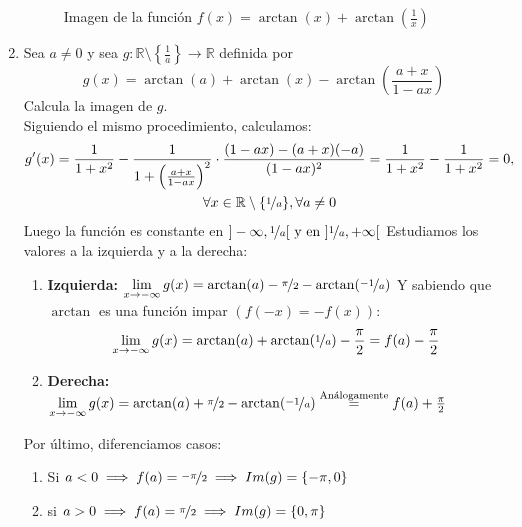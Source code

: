 \documentclass[12pt]{article}
\begin{document}
\begin{ejercicio}
\begin{enumerate}[label=\alph*)]
\begin{figure}
        \caption{Imagen de la función $f(x) = \arctan(x) + \arctan\left(\frac{1}{x}\right)$}
        \label{fig:imagen-f}
    \end{figure}
    
     \item Sea $a\neq 0$ y sea $g:\mathbb{R}\setminus \left\{\frac{1}{a}\right\}\longrightarrow \mathbb{R}$ definida por
                \begin{equation*}
                    g(x) = \arctan(a) + \arctan(x) - \arctan\left(\dfrac{a+x}{1-ax}\right)
                \end{equation*}
                Calcula la imagen de $g$.\\

    Siguiendo el mismo procedimiento, calculamos:
    \begin{multline*}
        g'(x) = \frac1{1+x^2}-\frac{1}{1 + \left( \frac{a + x}{1 - ax} \right)^2} \cdot
        \frac{(1 - ax) - (a + x)(-a)}{(1 - ax)^2} = \frac1{1+x^2}-\frac1{1+x^2} = 0,
        \\\forall x \in \mathbb{R}\setminus\{\nicefrac{1}{a}\}, \forall a \neq0
    \end{multline*}
Luego la función es constante en $]-\infty,\nicefrac{1}{a}[ \text{ y en } ]\nicefrac{1}{a}, +\infty[$
\newline
Estudiamos los valores a la izquierda y a la derecha:
\begin{enumerate}
    \item \textbf{Izquierda: } $\lim\limits_{x\to -\infty}{g(x)}=\arctan(a)  - \nicefrac{\pi}{2} - \arctan(\nicefrac{-1}{a})$ \newline Y sabiendo que $\arctan$ es una función impar $(f(-x) = -f(x))$: $$\lim\limits_{x\to -\infty}{g(x)}=\arctan(a)+\arctan(\nicefrac{1}{a}) - \frac \pi2 = f(a) - \frac \pi2$$
    \item \textbf{Derecha: } $\lim\limits_{x\to -\infty}{g(x)}=\arctan(a) + \nicefrac{\pi}{2} - \arctan(\nicefrac{-1}{a}) \overset{\text{Análogamente}}{=} f(a) +\frac \pi2$ 
\end{enumerate}
Por último, diferenciamos casos:
\begin{enumerate}
    \item Si $a<0 \implies f(a) = \nicefrac{-\pi}{2} \implies Im(g) = \{-\pi,0\}$
    \item si $a>0 \implies f(a) = \nicefrac{\pi}{2} \implies Im(g) = \{0, \pi\}$
\end{enumerate}
\end{enumerate}
\end{ejercicio}
\end{document}
